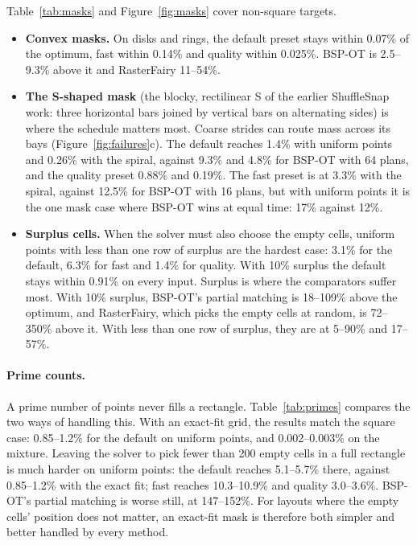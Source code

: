 Table~\ref{tab:masks} and Figure~\ref{fig:masks} cover non-square targets.
\begin{itemize}
\item \textbf{Convex masks.} On disks and rings, the default preset stays within 0.07\% of
  the optimum, fast within 0.14\% and quality within 0.025\%. BSP-OT is 2.5--9.3\% above it
  and RasterFairy 11--54\%.
\item \textbf{The S-shaped mask} (the blocky, rectilinear S of the earlier ShuffleSnap
  work: three horizontal bars joined by vertical bars on alternating sides) is where the
  schedule matters most. Coarse strides can route mass across its bays
  (Figure~\ref{fig:failures}c). The default reaches 1.4\% with uniform points and 0.26\%
  with the spiral, against 9.3\% and 4.8\% for BSP-OT with 64 plans, and the quality preset
  0.88\% and 0.19\%. The fast preset is at 3.3\% with the spiral, against 12.5\% for BSP-OT
  with 16 plans, but with uniform points it is the one mask case where BSP-OT wins at equal
  time: 17\% against 12\%.
\item \textbf{Surplus cells.} When the solver must also choose the empty cells, uniform points
  with less than one row of surplus are the hardest case: 3.1\% for the default, 6.3\% for
  fast and 1.4\% for quality. With 10\% surplus the default stays within 0.91\% on every
  input. Surplus is where the comparators suffer most. With 10\% surplus, BSP-OT's partial
  matching is 18--109\% above the optimum, and RasterFairy, which picks the empty cells at
  random, is 72--350\% above it. With less than one row of surplus, they are at 5--90\% and
  17--57\%.
\end{itemize}

\begin{table}[tbp]
\centering\small
\caption{Prime point counts, excess over the certified optimum (\%), mean of instance seeds 1--3
(24 threads; all 8 timed exact runs certified). The \emph{exact fit} target is a near-square grid
whose last row is partially usable, so every cell is filled. The \emph{full rectangle} has a few
surplus cells (177 for $N=49{,}999$, 181 for $N=99{,}991$), and the solver must also choose which
cells stay empty.}
\label{tab:primes}

\end{table}

\paragraph{Prime counts.} A prime number of points never fills a rectangle.
Table~\ref{tab:primes} compares the two ways of handling this. With an exact-fit grid,
the results match the square case: 0.85--1.2\% for the default on uniform points, and
0.002--0.003\% on the mixture. Leaving the solver to pick fewer than 200 empty cells in a
full rectangle is much harder on uniform points: the default reaches 5.1--5.7\% there, against
0.85--1.2\% with the exact fit; fast reaches 10.3--10.9\% and quality 3.0--3.6\%. BSP-OT's
partial matching is worse still, at 147--152\%. For layouts where the empty cells' position does
not matter, an exact-fit mask is therefore both simpler and better handled by every method.
